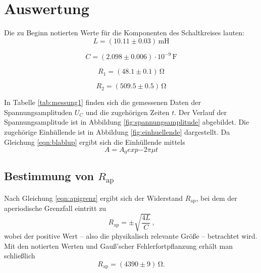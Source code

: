 \section{Auswertung}
\label{sec:Auswertung}
Die zu Beginn notierten Werte für die Komponenten des Schaltkreises lauten:
\begin{equation*}
  L=(10.11 \pm 0.03) \,\si{\milli\henry}
\end{equation*}

\begin{equation*}
C=(2.098 \pm 0.006) \cdot 10^{-9} \, \si{\farad}
\end{equation*}

\begin{equation*}
R_\text{1}= (48.1 \pm 0.1) \, \si{\ohm}
\end{equation*}

\begin{equation*}
R_\text{2}= (509.5\pm 0.5)\,\si{\ohm}
\end{equation*}


In Tabelle \ref{tab:messung1} finden sich die gemessenen Daten der Spannungsamplituden $U_C$ und die zugehörigen Zeiten $t$.
Der Verlauf der Spannungsamplitude ist in Abbildung \ref{fig:spannungsamplitude} abgebildet. Die zugehörige Einhüllende ist in Abbildung \ref{fig:einhuellende} dargestellt.
Da  Gleichung \eqref{eqn:blablup} ergibt sich die Einhüllende mittels
\begin{equation}
A=A_\text{0}exp{-2 \pi \mu t}
\end{equation}

\subsection{Bestimmung von $R_{\text{ap}}$}

Nach Gleichung \eqref{eqn:apigrenz} ergibt sich der Widerstand $R_{\text{ap}}$, bei dem der 
aperiodische Grenzfall eintritt zu
\begin{equation}
	R_{\text{ap}} = \pm \sqrt{\frac{4L}{C}} \, \text{,}
	\label{eqn:rap}
\end{equation}
wobei der positive Wert -- also die physikalisch relevante Größe -- betrachtet wird.
Mit den notierten Werten und Gauß'scher Fehlerfortpflanzung erhält man schließlich
\begin{equation*}
	R_{\text{ap}} = (4390 \pm 9) \, \si{\ohm} \text{.}
\end{equation*}

